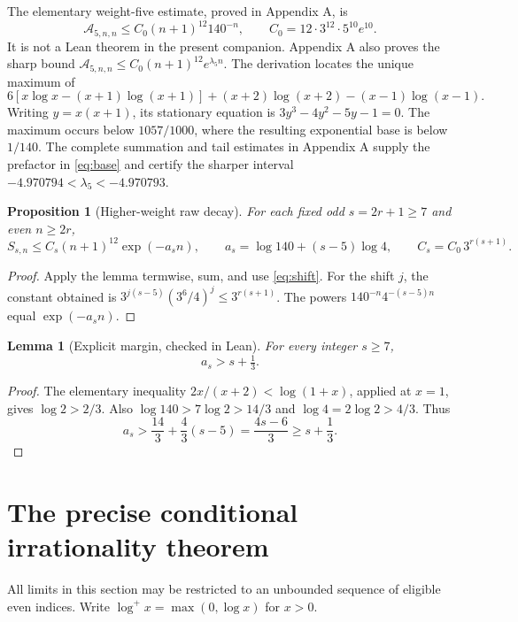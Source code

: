\documentclass[11pt]{article}
\newtheorem{proposition}[theorem]{Proposition}
\newtheorem{lemma}[theorem]{Lemma}
\theoremstyle{remark}
\newcommand{\cA}{\mathcal A}
\newcommand{\la}{\lambda}
\begin{document}
The elementary weight-five estimate, proved in Appendix A, is
\begin{equation}
 \cA_{5,n,n}\le C_0(n+1)^{12}140^{-n},
 \qquad C_0=12\cdot3^{12}\cdot5^{10}e^{10}.
 \label{eq:base}
\end{equation}
It is not a Lean theorem in the present companion. Appendix A also proves
the sharp bound \(\cA_{5,n,n}\le C_0(n+1)^{12}e^{\la_5n}\).
The derivation locates
the unique maximum of
\[
 6[x\log x-(x+1)\log(x+1)]
 +(x+2)\log(x+2)-(x-1)\log(x-1).
\]
Writing \(y=x(x+1)\), its stationary equation is
\(3y^3-4y^2-5y-1=0\).
The maximum occurs below \(1057/1000\), where the resulting exponential
base is below \(1/140\). The complete summation and tail estimates in
Appendix A supply the prefactor in \eqref{eq:base} and certify the sharper
interval \(-4.970794<\la_5<-4.970793\).

\begin{proposition}[Higher-weight raw decay]
For each fixed odd \(s=2r+1\ge7\) and
even \(n\ge2r\),
\begin{equation}
 S_{s,n}\le C_s(n+1)^{12}\exp(-a_s n),\qquad
 a_s=\log140+(s-5)\log4,\qquad
 C_s=C_0\,3^{r(s+1)}.
 \label{eq:raw}
\end{equation}
\end{proposition}
\begin{proof}
Apply the lemma termwise, sum, and use \eqref{eq:shift}.
For the shift \(j\), the constant obtained is
\(3^{j(s-5)}(3^6/4)^j\le3^{r(s+1)}\).
The powers \(140^{-n}4^{-(s-5)n}\) equal \(\exp(-a_s n)\).
\end{proof}

\begin{lemma}[Explicit margin, checked in Lean]
For every integer \(s\ge7\),
\begin{equation}
 a_s>s+\tfrac13.
 \label{eq:margin}
\end{equation}
\end{lemma}
\begin{proof}
The elementary inequality \(2x/(x+2)<\log(1+x)\), applied at \(x=1\),
gives \(\log2>2/3\). Also
\(\log140>7\log2>14/3\) and \(\log4=2\log2>4/3\).
Thus
\[
 a_s>\frac{14}{3}+\frac43(s-5)=\frac{4s-6}{3}
 \ge s+\frac13.
\]
\end{proof}

\section{The precise conditional irrationality theorem}
All limits in this section may be restricted to an unbounded sequence
of eligible even indices. Write \(\log^+x=\max(0,\log x)\) for \(x>0\).
\end{document}

